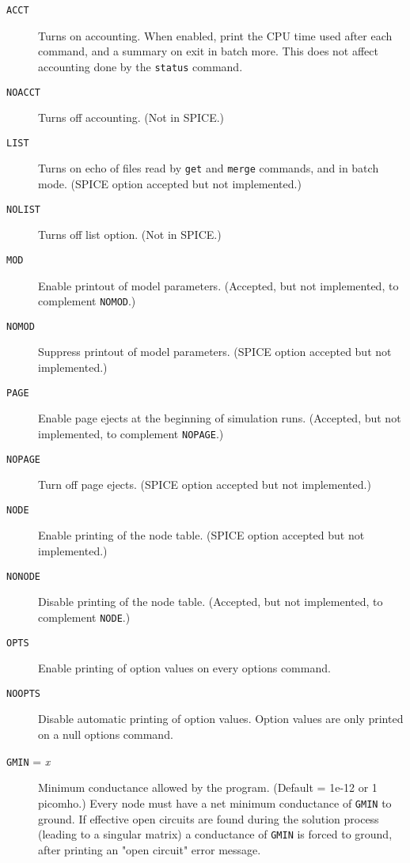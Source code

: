 \begin{description}

\item[{\tt ACCT}] Turns on accounting.  When enabled, print the
CPU time used after each command, and a summary on exit in batch
more.  This does not affect accounting done by the {\tt status}
command.

\item[{\tt NOACCT}] Turns off accounting.  (Not in SPICE.)

\item[{\tt LIST}] Turns on echo of files read by {\tt get} and
{\tt merge} commands, and in batch mode.  (SPICE option accepted
but not implemented.)

\item[{\tt NOLIST}] Turns off list option.  (Not in SPICE.)

\item[{\tt MOD}] Enable printout of model parameters.  (Accepted,
but not implemented, to complement {\tt NOMOD}.)

\item[{\tt NOMOD}] Suppress printout of model parameters.  (SPICE
option accepted but not implemented.)

\item[{\tt PAGE}] Enable page ejects at the beginning of
simulation runs.  (Accepted, but not implemented, to complement
{\tt NOPAGE}.)

\item[{\tt NOPAGE}] Turn off page ejects.  (SPICE option accepted
but not implemented.)

\item[{\tt NODE}] Enable printing of the node table.  (SPICE
option accepted but not implemented.)

\item[{\tt NONODE}] Disable printing of the node table.
(Accepted, but not implemented, to complement {\tt NODE}.)

\item[{\tt OPTS}] Enable printing of option values on every options
command.

\item[{\tt NOOPTS}] Disable automatic printing of option values.
Option values are only printed on a null options command.

\item[{\tt GMIN} = {\it x}] Minimum conductance allowed by the program.
(Default = 1e-12 or 1 picomho.)  Every node must have a net
minimum conductance of {\tt GMIN} to ground.  If effective open
circuits are found during the solution process (leading to a
singular matrix) a conductance of {\tt GMIN} is forced to
ground, after printing an "open circuit" error message.


\end{description}
